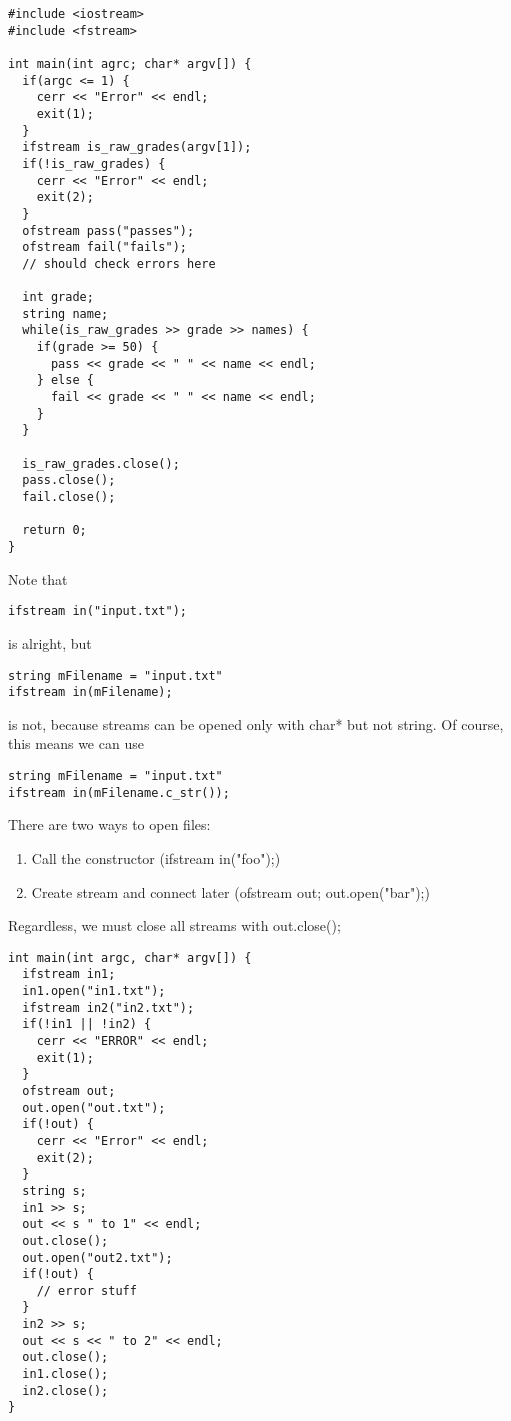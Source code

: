 \documentclass[12pt]{article}
\begin{document}
\begin{verbatim}
#include <iostream>
#include <fstream>

int main(int agrc; char* argv[]) {
  if(argc <= 1) {
    cerr << "Error" << endl;
    exit(1);
  }
  ifstream is_raw_grades(argv[1]);
  if(!is_raw_grades) {
    cerr << "Error" << endl;
    exit(2);
  }
  ofstream pass("passes");
  ofstream fail("fails");
  // should check errors here

  int grade;
  string name;
  while(is_raw_grades >> grade >> names) {
    if(grade >= 50) {
      pass << grade << " " << name << endl;
    } else {
      fail << grade << " " << name << endl;
    }
  }

  is_raw_grades.close();
  pass.close();
  fail.close();

  return 0;
}
\end{verbatim}

Note that
\begin{verbatim}
ifstream in("input.txt");
\end{verbatim}
is alright, but
\begin{verbatim}
string mFilename = "input.txt"
ifstream in(mFilename);
\end{verbatim}
is not, because streams can be opened only with char* but not string. Of course, this means we can use
\begin{verbatim}
string mFilename = "input.txt"
ifstream in(mFilename.c_str());
\end{verbatim}

There are two ways to open files:
\begin{enumerate}
\item Call the constructor (ifstream in("foo");)
\item Create stream and connect later (ofstream out; out.open("bar");)
\end{enumerate}

Regardless, we must close all streams with out.close();

\begin{verbatim}
int main(int argc, char* argv[]) {
  ifstream in1;
  in1.open("in1.txt");
  ifstream in2("in2.txt");
  if(!in1 || !in2) {
    cerr << "ERROR" << endl;
    exit(1);
  }
  ofstream out;
  out.open("out.txt");
  if(!out) {
    cerr << "Error" << endl;
    exit(2);
  }
  string s;
  in1 >> s;
  out << s " to 1" << endl;
  out.close();
  out.open("out2.txt");
  if(!out) {
    // error stuff
  }
  in2 >> s;
  out << s << " to 2" << endl;
  out.close();
  in1.close();
  in2.close();
}
\end{verbatim}
\end{document}
